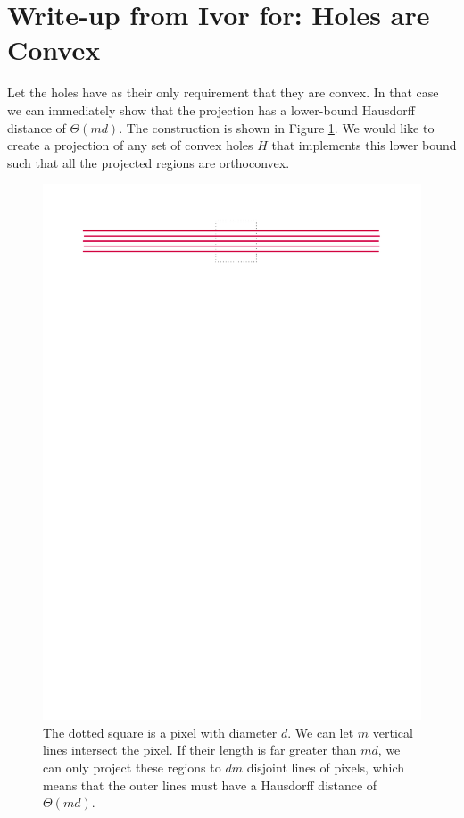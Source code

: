 \documentclass[a4paper,UKenglish,cleveref]{lipics-v2019}
\begin{document}
\section{Write-up from Ivor for: Holes are Convex}



Let the holes have as their only requirement that they are convex. In that case we can immediately show that the projection has a lower-bound Hausdorff distance of $\Theta(md)$. The construction is shown in Figure \ref{fig:linesexample}. We would like to create a projection of any set of convex holes $H$ that implements this lower bound such that all the projected regions are orthoconvex.


\begin{figure}[H]
\centering
\includegraphics[width=\textwidth]{Figures/linesexample.pdf}
\caption{The dotted square is a pixel with diameter $d$. We can let $m$ vertical lines intersect the pixel. If their length is far greater than $md$, we can only project these regions to $dm$ disjoint lines of pixels, which means that the outer lines must have a Hausdorff distance of $\Theta(md)$.}
\label{fig:linesexample}
\end{figure}
\end{document}
